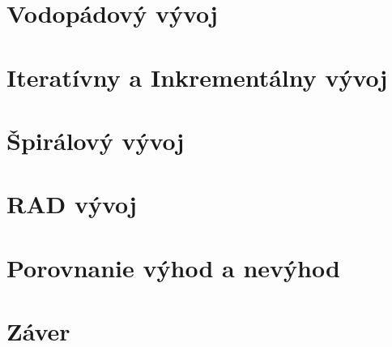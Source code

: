\documentclass{article}
\begin{document}
\section{Vodopádový vývoj}

\section{Iteratívny a Inkrementálny vývoj}

\section{Špirálový vývoj}

\section{RAD vývoj}

\section{Porovnanie výhod a nevýhod}

\section{Záver}
\end{document}
